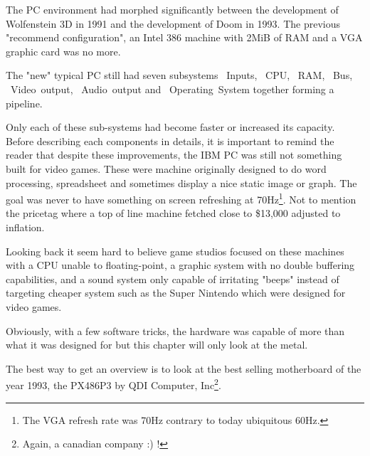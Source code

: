 The PC environment had morphed significantly between the development of Wolfenstein 3D in 1991 and the development of Doom in 1993. The previous "recommend configuration", an Intel 386 machine with 2MiB of RAM and a VGA graphic card was no more.\\
\par
The "new" typical PC still had seven subsystems ~Inputs, ~CPU, ~RAM, ~Bus, ~Video~output, ~Audio~output and ~Operating~System together forming a pipeline.\\
\par
{}
\par
Only each of these sub-systems had become faster or increased its capacity. Before describing each components in details, it is important to remind the reader that despite these improvements, the IBM PC was still not something built for video games. These were machine originally designed to do word processing, spreadsheet and sometimes display a nice static image or graph. The goal was never to have something on screen refreshing at 70Hz\footnote{The VGA refresh rate was 70Hz contrary to today ubiquitous 60Hz.}. Not to mention the pricetag where a top of line machine fetched close to \$13,000 adjusted to inflation.\\
\par Looking back it seem hard to believe game studios focused on these machines with a CPU unable to floating-point, a graphic system with no double buffering capabilities, and a sound system only capable of irritating "beeps" instead of targeting cheaper system such as the Super Nintendo which were designed for video games.\\
\par
Obviously, with a few software tricks, the hardware was capable of more than what it was designed for but this chapter will only look at the metal.\\
\par



\cleartoleftpage
 The best way to get an overview is to look at the best selling motherboard of the year 1993, the PX486P3 by QDI Computer, Inc\footnote{Again, a canadian company :) !}.\\
\par

